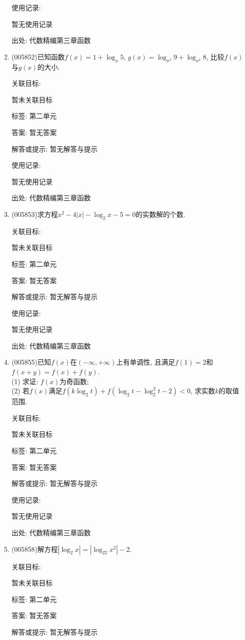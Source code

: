 \documentclass[10pt,a4paper]{article}
\begin{document}
\begin{enumerate}[1.]
使用记录:

暂无使用记录


出处: 代数精编第三章函数
\item { (005852)}已知函数$f(x)=1+\log_x5$, $g(x)=\log_{x^2}9+\log_{x^2}8$, 比较$f(x)$与$g(x)$的大小.


关联目标:

暂未关联目标



标签: 第二单元

答案: 暂无答案

解答或提示: 暂无解答与提示

使用记录:

暂无使用记录


出处: 代数精编第三章函数
\item { (005853)}求方程$x^2-4|x|-\log_2x-5=0$的实数解的个数.


关联目标:

暂未关联目标



标签: 第二单元

答案: 暂无答案

解答或提示: 暂无解答与提示

使用记录:

暂无使用记录


出处: 代数精编第三章函数
\item { (005855)}已知$f(x)$在$(-\infty ,+\infty)$上有单调性, 且满足$f(1)=2$和$f(x+y)=f(x)+f(y)$.\\
(1) 求证: $f(x)$为奇函数;\\
(2) 若$f(x)$满足$f(k\log_2t)+f(\log_2t-\log_2^2t-2)<0$, 求实数$k$的取值范围.


关联目标:

暂未关联目标



标签: 第二单元

答案: 暂无答案

解答或提示: 暂无解答与提示

使用记录:

暂无使用记录


出处: 代数精编第三章函数
\item { (005858)}解方程$|\log_2x|=|\log_22x^2|-2$.


关联目标:

暂未关联目标



标签: 第二单元

答案: 暂无答案

解答或提示: 暂无解答与提示


\end{enumerate}
\end{document}
